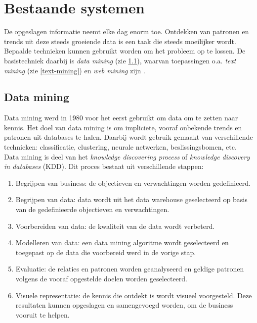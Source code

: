 \chapter{Bestaande systemen}

De opgeslagen informatie neemt elke dag enorm toe. Ontdekken van patronen en trends uit deze steeds groeiende data is een taak die steeds moeilijker wordt. Bepaalde technieken kunnen gebruikt worden om het probleem op te lossen. De basistechniek daarbij is \textit{data mining} (zie \ref{data-mining}), waarvan toepassingen o.a. \textit{text mining} (zie \ref{text-mining}) en \textit{web mining} zijn \cite{Nasa2012}. 

\section{Data mining}\label{data-mining}
Data mining werd in 1980 voor het eerst gebruikt om data om te zetten naar kennis. Het doel van data mining is om impliciete, vooraf onbekende trends en patronen uit databases te halen. Daarbij wordt gebruik gemaakt van verschillende technieken: classificatie, clustering, neurale netwerken, beslissingsbomen, etc. 
\\Data mining is deel van het \textit{knowledge discovering process} of \textit{knowledge discovery in databases} (KDD). Dit proces bestaat uit verschillende stappen:
\begin{enumerate}
	\item Begrijpen van business: de objectieven en verwachtingen worden gedefinieerd.
	\item Begrijpen van data: data wordt uit het data warehouse geselecteerd op basis van de gedefinieerde objectieven en verwachtingen.
	\item Voorbereiden van data: de kwaliteit van de data wordt verbeterd.
	\item Modelleren van data: een data mining algoritme wordt geselecteerd en toegepast op de data die voorbereid werd in de vorige stap.
	\item Evaluatie: de relaties en patronen worden geanalyseerd en geldige patronen volgens de vooraf opgestelde doelen worden geselecteerd.
	\item Visuele representatie: de kennis die ontdekt is wordt visueel voorgesteld. Deze resultaten kunnen opgeslagen en samengevoegd worden, om de business vooruit te helpen.
\end{enumerate}

